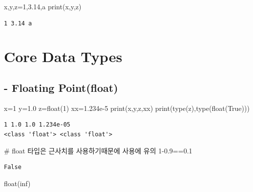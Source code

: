 \documentclass[
  letterpaper,
  DIV=11,
  numbers=noendperiod]{scrreprt}
\newenvironment{Shaded}{\begin{snugshade}}{\end{snugshade}}
\newcommand{\BuiltInTok}[1]{\textcolor[rgb]{0.00,0.23,0.31}{#1}}
\newcommand{\CommentTok}[1]{\textcolor[rgb]{0.37,0.37,0.37}{#1}}
\newcommand{\DecValTok}[1]{\textcolor[rgb]{0.68,0.00,0.00}{#1}}
\newcommand{\FloatTok}[1]{\textcolor[rgb]{0.68,0.00,0.00}{#1}}
\newcommand{\NormalTok}[1]{\textcolor[rgb]{0.00,0.23,0.31}{#1}}
\newcommand{\OperatorTok}[1]{\textcolor[rgb]{0.37,0.37,0.37}{#1}}
\newcommand{\StringTok}[1]{\textcolor[rgb]{0.13,0.47,0.30}{#1}}
\newcommand{\VariableTok}[1]{\textcolor[rgb]{0.07,0.07,0.07}{#1}}
\begin{document}
\begin{Shaded}
\begin{Highlighting}[]
\NormalTok{x,y,z}\OperatorTok{=}\DecValTok{1}\NormalTok{,}\FloatTok{3.14}\NormalTok{,}\StringTok{\textquotesingle{}a\textquotesingle{}}
\BuiltInTok{print}\NormalTok{(x,y,z)}
\end{Highlighting}
\end{Shaded}

\begin{verbatim}
1 3.14 a
\end{verbatim}

\section{Core Data Types}\label{core-data-types}

\subsection{- Floating Point(float)}\label{floating-pointfloat}

\begin{Shaded}
\begin{Highlighting}[]
\NormalTok{x}\OperatorTok{=}\DecValTok{1}
\NormalTok{y}\OperatorTok{=}\FloatTok{1.0}
\NormalTok{z}\OperatorTok{=}\BuiltInTok{float}\NormalTok{(}\DecValTok{1}\NormalTok{)}
\NormalTok{xx}\OperatorTok{=}\FloatTok{1.234e{-}5}
\BuiltInTok{print}\NormalTok{(x,y,z,xx)}
\BuiltInTok{print}\NormalTok{(}\BuiltInTok{type}\NormalTok{(z),}\BuiltInTok{type}\NormalTok{(}\BuiltInTok{float}\NormalTok{(}\VariableTok{True}\NormalTok{)))}
\end{Highlighting}
\end{Shaded}

\begin{verbatim}
1 1.0 1.0 1.234e-05
<class 'float'> <class 'float'>
\end{verbatim}

\begin{Shaded}
\begin{Highlighting}[]
\CommentTok{\# float 타입은 근사치를 사용하기때문에 사용에 유의}
\DecValTok{1}\OperatorTok{{-}}\FloatTok{0.9}\OperatorTok{==}\FloatTok{0.1}
\end{Highlighting}
\end{Shaded}

\begin{verbatim}
False
\end{verbatim}

\begin{Shaded}
\begin{Highlighting}[]
\BuiltInTok{float}\NormalTok{(}\StringTok{\textquotesingle{}inf\textquotesingle{}}\NormalTok{)}
\end{Highlighting}
\end{Shaded}
\end{document}

